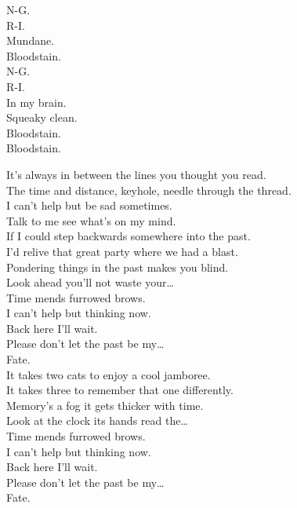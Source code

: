 N-G. \\
R-I. \\
Mundane. \\
Bloodstain. \\
N-G. \\
R-I. \\
In my brain. \\
Squeaky clean. \\
Bloodstain. \\

Bloodstain. \\




It's always in between the lines you thought you read. \\
The time and distance, keyhole, needle through the thread. \\
I can't help but be sad sometimes. \\
Talk to me see what's on my mind. \\

If I could step backwards somewhere into the past. \\
I'd relive that great party where we had a blast. \\
Pondering things in the past makes you blind. \\
Look ahead you'll not waste your… \\

Time mends furrowed brows. \\
I can't help but thinking now. \\
Back here I'll wait. \\
Please don't let the past be my… \\
Fate. \\

It takes two cats to enjoy a cool jamboree. \\
It takes three to remember that one differently. \\
Memory's a fog it gets thicker with time. \\
Look at the clock its hands read the… \\

Time mends furrowed brows. \\
I can't help but thinking now. \\
Back here I'll wait. \\
Please don't let the past be my… \\
Fate. \\


